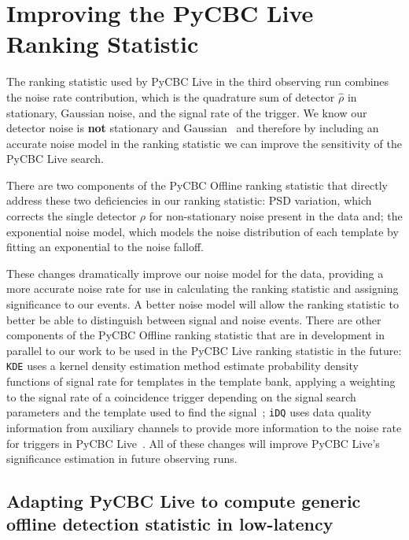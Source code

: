 \section{\label{5:new-additions}Improving the PyCBC Live Ranking Statistic}

The ranking statistic used by PyCBC Live in the third observing run combines the noise rate contribution, which is the quadrature sum of detector $\hat{\rho}$ in stationary, Gaussian noise, and the signal rate of the trigger. We know our detector noise is \textbf{not} stationary and Gaussian~\cite{LIGO_data_quality:2015} and therefore by including an accurate noise model in the ranking statistic we can improve the sensitivity of the PyCBC Live search.

There are two components of the PyCBC Offline ranking statistic that directly address these two deficiencies in our ranking statistic: PSD variation, which corrects the single detector $\rho$ for non-stationary noise present in the data and; the exponential noise model, which models the noise distribution of each template by fitting an exponential to the noise falloff.

These changes dramatically improve our noise model for the data, providing a more accurate noise rate for use in calculating the ranking statistic and assigning significance to our \gwadj events. A better noise model will allow the ranking statistic to better be able to distinguish between signal and noise events. There are other components of the PyCBC Offline ranking statistic that are in development in parallel to our work to be used in the PyCBC Live ranking statistic in the future: \verb|KDE| uses a kernel density estimation method estimate probability density functions of signal rate for templates in the template bank, applying a weighting to the signal rate of a coincidence trigger depending on the signal search parameters and the template used to find the signal~\cite{PyCBC_focussed_bbh:2024}; \verb|iDQ| uses data quality information from auxiliary channels to provide more information to the noise rate for triggers in PyCBC Live~\cite{iDQ:2020}. All of these changes will improve PyCBC Live's significance estimation in future observing runs. 

\subsection{\label{5:sec:methodology}Adapting PyCBC Live to compute generic offline detection statistic in low-latency}


